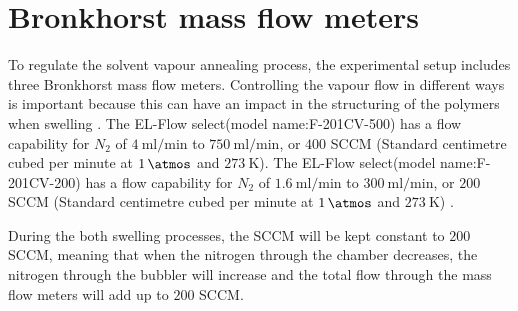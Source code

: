 \documentclass[MasterThesisMain.tex]{subfiles}
\begin{document}
\section{Bronkhorst mass flow meters}
To regulate the solvent vapour annealing process, the experimental setup includes three Bronkhorst mass flow meters. Controlling the vapour flow in different ways is important because this can have an impact in the structuring of the polymers when swelling \cite{SVABCP}. The EL-Flow select(model name:F-201CV-500) has a flow capability for $N_2$ of $\SI{4}{\milli\litre\per\minute}$ to $\SI{750}{\milli\litre\per\minute}$, or $400$ SCCM (Standard centimetre cubed per minute at $\SI{1}{\atmos}$ and $\SI{273}{\kelvin}$). The EL-Flow select(model name:F-201CV-200) has a flow capability for $N_2$ of $\SI{1.6}{\milli\litre\per\minute}$ to $\SI{300}{\milli\litre\per\minute}$, or $200$ SCCM (Standard centimetre cubed per minute at $\SI{1}{\atmos}$ and $\SI{273}{\kelvin}$) \cite{elflow}.

During the both swelling processes, the SCCM will be kept constant to $200$ SCCM, meaning that when the nitrogen through the chamber decreases, the nitrogen through the bubbler will increase and the total flow through the mass flow meters will add up to $200$ SCCM.
\end{document}
